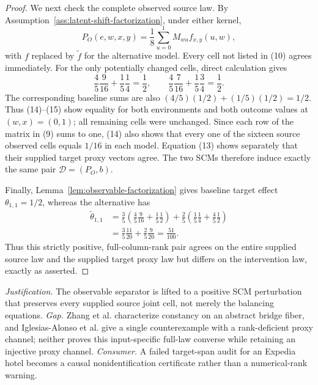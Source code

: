 \documentclass{article}
\begin{document}
\begin{proof}
We next check the complete observed source law. By Assumption~\ref{ass:latent-shift-factorization}, under either kernel,
\[
P_O(e,w,x,y)=\frac18\sum_{u=0}^1 M_{wu}f_{x,y}(u,w),
\tag{14}
\]
with \(f\) replaced by \(\widetilde f\) for the alternative model. Every cell not listed in (10) agrees immediately. For the only potentially changed cells, direct calculation gives
\[
\frac45\frac9{16}+\frac15\frac14=\frac12,
\qquad
\frac45\frac7{16}+\frac15\frac34=\frac12.
\tag{15}
\]
The corresponding baseline sums are also \((4/5)(1/2)+(1/5)(1/2)=1/2\). Thus (14)--(15) show equality for both environments and both outcome values at \((w,x)=(0,1)\); all remaining cells were unchanged. Since each row of the matrix in (9) sums to one, (14) also shows that every one of the sixteen source observed cells equals \(1/16\) in each model. Equation (13) shows separately that their supplied target proxy vectors agree. The two SCMs therefore induce exactly the same pair \(\mathcal D=(P_O,b)\).

Finally, Lemma~\ref{lem:observable-factorization} gives baseline target effect \(\theta_{1,1}=1/2\), whereas the alternative has
\[
\begin{aligned}
\widetilde\theta_{1,1}
&=\frac35\left(\frac45\frac9{16}+\frac15\frac12\right)
 +\frac25\left(\frac15\frac14+\frac45\frac12\right)\\
&=\frac35\frac{11}{20}+\frac25\frac9{20}
=\frac{51}{100}.
\end{aligned}
\tag{16}
\]
Thus this strictly positive, full-column-rank pair agrees on the entire supplied source law and the supplied target proxy law but differs on the intervention law, exactly as asserted.
\end{proof}
\par\smallskip\noindent \textit{Justification.} The observable separator is lifted to a positive SCM perturbation that preserves every supplied source joint cell, not merely the balancing equations. \textit{Gap.} Zhang et al. characterize constancy on an abstract bridge fiber, and Iglesias-Alonso et al. give a single counterexample with a rank-deficient proxy channel; neither proves this input-specific full-law converse while retaining an injective proxy channel. \textit{Consumer.} A failed target-span audit for an Expedia hotel becomes a causal nonidentification certificate rather than a numerical-rank warning.
\end{document}
